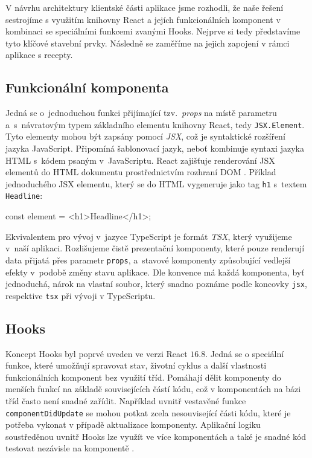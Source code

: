 V návrhu architektury klientské části aplikace jsme rozhodli, že naše řešení sestrojíme s využitím knihovny React a jejích funkcionálních komponent v kombinaci se speciálními funkcemi zvanými Hooks. Nejprve si tedy představíme tyto klíčové stavební prvky. Následně se zaměříme na jejich zapojení v rámci aplikace s recepty.

\subsection{Funkcionální komponenta}

Jedná se o~jednoduchou funkci přijímající tzv.~\emph{props} na místě parametru a~s~návratovým typem základního elementu knihovny React, tedy \texttt{JSX.Element}. Tyto elementy mohou být zapsány pomocí \emph{JSX}, což je syntaktické rozšíření jazyka JavaScript. Připomíná šablonovací jazyk, neboť kombinuje syntaxi jazyka HTML s~kódem psaným v~JavaScriptu. React zajišťuje renderování JSX elementů do HTML dokumentu prostřednictvím rozhraní DOM \citep{jsx-intro}. Příklad jednoduchého JSX elementu, který se do HTML vygeneruje jako tag \texttt{h1} s~textem \texttt{Headline}:

\begin{code}
const element = <h1>Headline</h1>;
\end{code}

Ekvivalentem pro vývoj v~jazyce TypeScript je formát \emph{TSX}, který využijeme v~naší aplikaci. Rozlišujeme čistě prezentační komponenty, které pouze renderují data přijatá přes parametr \texttt{props}, a~stavové komponenty způsobující vedlejší efekty v~podobě změny stavu aplikace. Dle konvence má každá komponenta, byť jednoduchá, nárok na vlastní soubor, který snadno poznáme podle koncovky \texttt{jsx}, respektive \texttt{tsx} při vývoji v TypeScriptu.

\subsection{Hooks}

Koncept Hooks byl poprvé uveden ve verzi React $16.8$. Jedná se o speciální funkce, které umožňují spravovat stav, životní cyklus a další vlastnosti funkcionálních komponent bez využití tříd. Pomáhají dělit komponenty do menších funkcí na základě souvisejících částí kódu, což v komponentách na bázi tříd často není snadné zařídit. Například uvnitř vestavěné funkce \texttt{componentDidUpdate} se mohou potkat zcela nesouvisející části kódu, které je potřeba vykonat v případě aktualizace komponenty. Aplikační logiku soustředěnou uvnitř Hooks lze využít ve více komponentách a také je snadné kód testovat nezávisle na komponentě \citep{react-hooks}.

